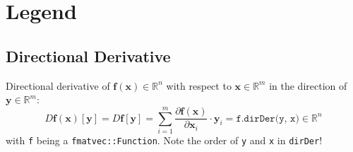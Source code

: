 \documentclass{article}
\newcommand{\bs}[1]{\boldsymbol #1}
\begin{document}
\section{Legend}\label{legend}
\subsection{Directional Derivative}
Directional derivative of $\bs{f}(\bs{x}) \in \mathbb{R}^{n}$ with respect to $\bs{x} \in \mathbb{R}^m$ in the direction of $\bs{y} \in \mathbb{R}^m$:
\begin{equation}
  D\bs{f}(\bs{x})[\bs{y}]=D\bs{f}[\bs{y}]=\sum_{i=1}^m\frac{\partial \bs{f}(\bs{x})}{\partial \bs{x}_i}\cdot\bs{y}_i=\texttt{f.dirDer(y, x)} \in \mathbb{R}^n
\end{equation}
with \texttt{f} being a \texttt{fmatvec::Function}. Note the order of \texttt{y} and \texttt{x} in \texttt{dirDer}!
\end{document}
